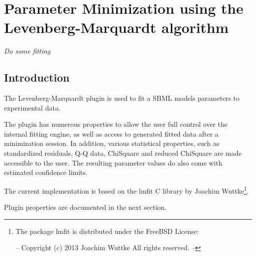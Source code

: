 \newcommand{\pname}{Levenberg-Maqrquardt}

\chapter*{Parameter Minimization using the Levenberg-Marquardt algorithm}
\setcounter{chapter}{1}
\emph{Do some fitting}
\section{Introduction}
The Levenberg-Marquardt plugin is used to fit a SBML models parameters to experimental data. 

The plugin has numerous properties to allow the user full control over the internal fitting engine, as well as 
access to generated fitted data after a minimization session. In addition, various statistical properties, such as standardized residuals, Q-Q data, ChiSquare and reduced ChiSquare are made accessible to the user. The resulting parameter values do also come with estimated confidence limits.

The current implementation is based on the lmfit C library by Joachim Wuttke\footnote{The package lmfit is distributed under the FreeBSD License:

--
  Copyright (c) 2013 Joachim Wuttke All rights reserved.
--}.


Plugin properties are documented in the next section.


